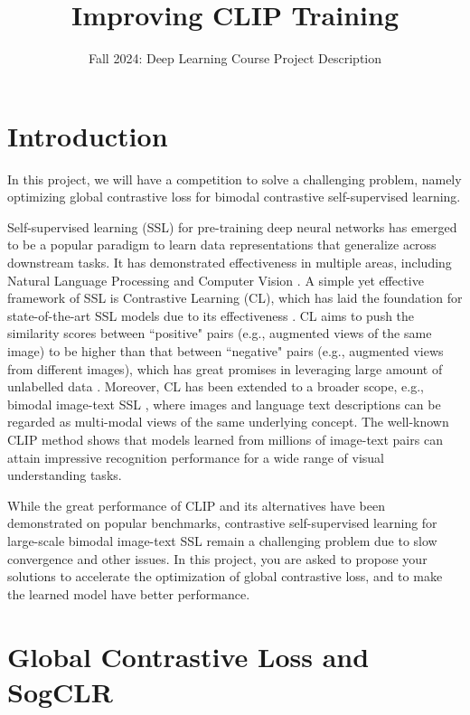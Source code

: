 \documentclass{article}
\title{Improving CLIP Training}
\author{Fall 2024: Deep Learning Course Project Description}
\begin{document}
\maketitle

\section{Introduction}

In this project, we will have a competition to solve a challenging problem, namely optimizing global contrastive loss for bimodal contrastive self-supervised learning.

Self-supervised learning (SSL) for pre-training deep neural networks has emerged to be a popular paradigm to learn data representations that generalize across downstream tasks. It has demonstrated effectiveness in multiple areas, including Natural Language Processing \cite{mikolov2013efficient,devlin2018bert,lan2019albert} and Computer Vision \cite{dosovitskiy2020image,zhu2020deformable,liu2021swin}. A simple yet effective framework of SSL is Contrastive Learning (CL), which has laid the foundation for state-of-the-art SSL models due to its effectiveness \cite{chen2020simple,he2020momentum,ReLiCv2,huang2022contrastive}. CL aims to push the similarity scores between ``positive" pairs (e.g., augmented views of the same image) to be higher than that between ``negative" pairs (e.g., augmented views from different images), which has great promises in leveraging large amount of unlabelled data \citep{goyal2021self,radford2021learning}. Moreover, CL has been extended to a broader scope, e.g., bimodal image-text SSL \citep{zhang2020contrastive,radford2021learning}, where images and language text descriptions can be regarded as multi-modal views of the same underlying concept. The well-known CLIP \citep{radford2021learning} method shows that models learned from millions of image-text pairs can attain impressive recognition performance for a wide range of visual understanding tasks.

While the great performance of CLIP and its alternatives have been demonstrated on popular benchmarks, contrastive self-supervised learning for large-scale bimodal image-text SSL remain a challenging problem due to slow convergence and other issues. In this project, you are asked to propose your solutions to accelerate the optimization of global contrastive loss, and to make the learned model have better performance.

\section{Global Contrastive Loss and SogCLR}
\end{document}
